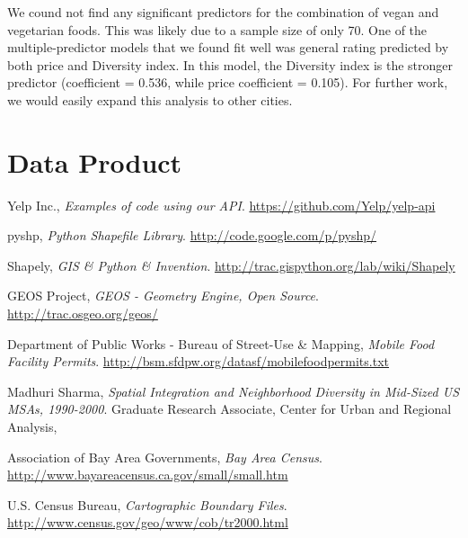 \documentclass[11pt,twocolumn]{article}
\begin{document}
We cound not find any significant predictors for the combination of vegan and vegetarian foods. This was likely due to a sample size of only 70. One of the multiple-predictor models that we found fit well was general rating predicted by both price and Diversity index. In this model, the Diversity index is the stronger predictor (coefficient = 0.536, while price coefficient = 0.105). For further work, we would easily expand this analysis to other cities.

\section{Data Product}

\begin{thebibliography}{9}

  Yelp Inc.,
  \emph{Examples of code using our API}.
  \url{https://github.com/Yelp/yelp-api}

  pyshp,
  \emph{Python Shapefile Library}.
  \url{http://code.google.com/p/pyshp/}

  Shapely,
  \emph{GIS \& Python \& Invention}.
  \url{http://trac.gispython.org/lab/wiki/Shapely}

  GEOS Project,
  \emph{GEOS - Geometry Engine, Open Source}.
  \url{http://trac.osgeo.org/geos/}

  Department of Public Works - Bureau of Street-Use \& Mapping,
  \emph{Mobile Food Facility Permits}.
  \url{http://bsm.sfdpw.org/datasf/mobilefoodpermits.txt}

  Madhuri Sharma,
  \emph{Spatial Integration and Neighborhood Diversity in Mid-Sized US MSAs, 1990-2000}.
  Graduate Research Associate,
  Center for Urban and Regional Analysis,

  Association of Bay Area Governments,
  \emph{Bay Area Census}.
  \url{http://www.bayareacensus.ca.gov/small/small.htm}

  U.S. Census Bureau,
  \emph{Cartographic Boundary Files}.
  \url{http://www.census.gov/geo/www/cob/tr2000.html}

\end{thebibliography}
\end{document}
